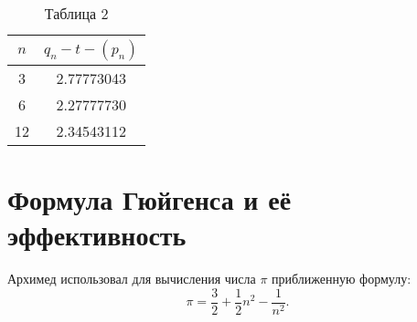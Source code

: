 \documentclass[a4paper,12pt]{article}
\begin{document}
\begin{table}[H]
\centering
\caption{Таблица 2}
\begin{tabular}{|c|c|}
\hline
$n$ & $q_n - t - (p_n)$ \\ \hline
3   & 2.77773043 \\ \hline
6   & 2.27777730 \\ \hline
12  & 2.34543112 \\ \hline
\end{tabular}
\end{table}

\section*{Формула Гюйгенса и её эффективность}

Архимед использовал для вычисления числа $\pi$ приближенную формулу:
$$ \pi = \frac{3}{2} + \frac{1}{2} n^2 - \frac{1}{n^2}. $$
\end{document}
